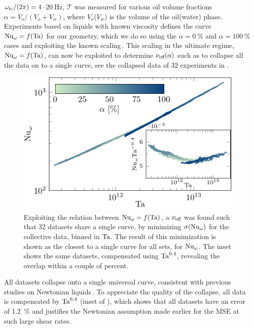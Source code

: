 $\omega_\text{ic}/(2\pi)=4$--$\SI{20}{\hertz}$,
$\mathcal{T}$ was measured for various oil volume fractions
$\alpha=V_o/(V_o+V_w)$, where $V_o$($V_w$) is the volume
of the oil(water) phase. Experiments based on liquids with known viscosity defines the curve $\text{Nu}_\omega=f(\text{Ta})$ for our geometry, which we do so using the $\alpha=\SI{0}{\percent}$ and $\alpha=\SI{100}{\percent}$ cases and exploiting the known scaling\,\cite{Lathrop1992,vanGils2011b,Paoletti2011}. This scaling in the ultimate regime, $\text{Nu}_\omega=f(\text{Ta})$, can now be exploited to determine $\nu_\text{eff}(\alpha)$ such as to collapse all the data on to a single curve, see the collapsed data of 32 experiments in .
%
\begin{figure}[t]
\centering
\includegraphics{tavsnuw.pdf}
\caption{%
    Exploiting the relation between $\text{Nu}_\omega=f(\text{Ta})$, a $\nu_\text{eff}$ was found such
    that 32 datasets share a single curve, by minimizing $\sigma(\text{Nu}_\omega)$ for the
    collective data, binned in $\text{Ta}$. The result of this minimization is shown
    as the closest to a single curve for all sets, for $\text{Nu}_\omega$. The inset shows
    the same datasets, compensated using $\text{Ta}^{0.4}$, revealing the overlap
    within a couple of percent.
}
\label{fig:torqueoil}
\end{figure}%
%
All datasets collapse onto a single universal curve, consistent
with previous studies on Newtonian liquids\,\cite{Lathrop1992,vanGils2011b, Ostilla-Monico2014b}.
To appreciate the quality of the collapse, all data is compensated by
$\text{Ta}^{0.4}$ (inset of ), which shows that all
datasets have an error of \SI{1.2}{\percent} and justifies the
Newtonian assumption made earlier for the MSE at such large shear rates.\\
